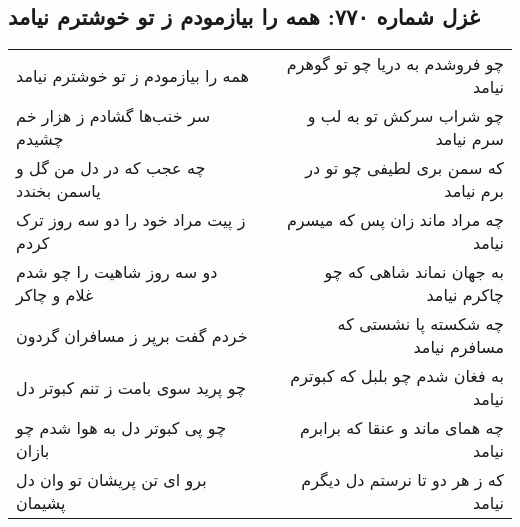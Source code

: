 \begin{center}
\section*{غزل شماره ۷۷۰: همه را بیازمودم ز تو خوشترم نیامد}
\label{sec:0770}
\begin{longtable}{l p{0.5cm} r}
همه را بیازمودم ز تو خوشترم نیامد
&&
چو فروشدم به دریا چو تو گوهرم نیامد
\\
سر خنب‌ها گشادم ز هزار خم چشیدم
&&
چو شراب سرکش تو به لب و سرم نیامد
\\
چه عجب که در دل من گل و یاسمن بخندد
&&
که سمن بری لطیفی چو تو در برم نیامد
\\
ز پیت مراد خود را دو سه روز ترک کردم
&&
چه مراد ماند زان پس که میسرم نیامد
\\
دو سه روز شاهیت را چو شدم غلام و چاکر
&&
به جهان نماند شاهی که چو چاکرم نیامد
\\
خردم گفت برپر ز مسافران گردون
&&
چه شکسته پا نشستی که مسافرم نیامد
\\
چو پرید سوی بامت ز تنم کبوتر دل
&&
به فغان شدم چو بلبل که کبوترم نیامد
\\
چو پی کبوتر دل به هوا شدم چو بازان
&&
چه همای ماند و عنقا که برابرم نیامد
\\
برو ای تن پریشان تو وان دل پشیمان
&&
که ز هر دو تا نرستم دل دیگرم نیامد
\\
\end{longtable}
\end{center}
